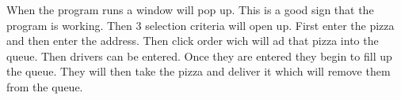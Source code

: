 When the program runs a window will pop up. This is a good sign that the program is working. Then 3 selection criteria will open up. First enter the pizza and then enter the address. Then click order wich will ad that pizza into the queue. Then drivers can be entered. Once they are entered they begin to fill up the queue. They will then take the pizza and deliver it which will remove them from the queue. 